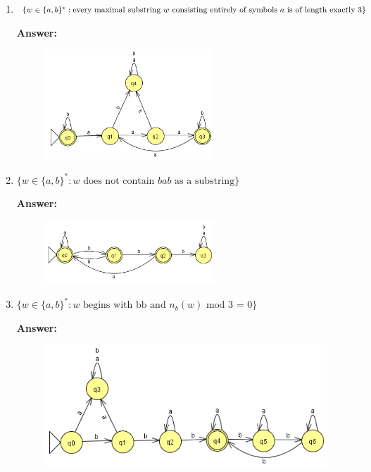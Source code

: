 \documentclass[12pt]{article}
\begin{document}
\begin{enumerate}
\begin{enumerate}
		      \item $\{w \in \{a,b \}^* : \text{every maximal substring } w \text{ consisting entirely of symbols } a \\ \text{ is of length exactly 3} \}$

		            \noindent \textbf{Answer:}

		            \begin{figure}[h!]
			            \centering
			            \includegraphics[width=0.6\textwidth]{img/q3/q3_b.png}
		            \end{figure}

		            \newpage

		      \item $\{w \in \{a,b \}^* : \text{$w$ does not contain $bab$ as a substring} \}$

		            \noindent \textbf{Answer:}

		            \begin{figure}[h!]
			            \centering
			            \includegraphics[width=0.6\textwidth]{img/q3/q3_c.png}
		            \end{figure}

		      \item $\{w \in \{a,b \}^* : \text{$w$ begins with bb and $n_b(w)$ mod 3 = 0} \}$

		            \noindent \textbf{Answer:}

		            \begin{figure}[h!]
			            \centering
			            \includegraphics[width=0.75	\textwidth]{img/q3/q3_d.png}
		            \end{figure}


\end{enumerate}
\end{enumerate}
\end{document}
